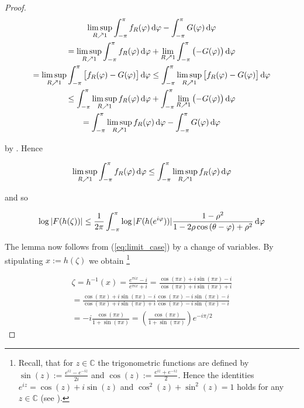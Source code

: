 \begin{proof}
\begin{multline*}
	\limsup_{R \nearrow 1} \int_{-\pi}^\pi f_R(\varphi) \d\varphi - \int_{-\pi}^\pi G(\varphi)\d\varphi\\
	= \limsup_{R \nearrow 1} \int_{-\pi}^\pi f_R(\varphi) \d\varphi + \lim_{R \nearrow 1}\int_{-\pi}^\pi \left(-G(\varphi)\right)\d\varphi\\
	= \limsup_{R \nearrow 1}\int_{-\pi}^\pi \left[ f_R(\varphi) - G(\varphi)\right]\d\varphi\leq \int_{-\pi}^\pi \limsup_{R \nearrow 1} \left[f_R(\varphi) - G(\varphi)\right]\d\varphi\\
	\leq \int_{-\pi}^\pi \limsup_{R \nearrow 1} f_R(\varphi) \d\varphi + \int_{-\pi}^\pi\lim_{R \nearrow 1} \left(-G(\varphi)\right)\d\varphi\\
	= \int_{-\pi}^\pi \limsup_{R \nearrow 1}f_R(\varphi) \d\varphi - \int_{-\pi}^\pi G(\varphi)\d\varphi
\end{multline*}

by \cite[358]{bourbaki:general_topology:1995}. Hence

\begin{equation*}
	\limsup_{R \nearrow 1} \int_{-\pi}^\pi f_R(\varphi) \mathop{}\!\mathrm{d}\varphi \leq\int_{-\pi}^\pi \limsup_{R \nearrow 1}f_R(\varphi) \mathop{}\!\mathrm{d}\varphi
\end{equation*}

and so 

\begin{equation}
	\log\vert F( h( \zeta ) )\vert \leq \frac{1}{2\pi} \int_{-\pi}^\pi \log\vert F( h( e^{i\varphi}))\vert \frac{1 - \rho^2}{1 - 2\rho\cos\left( \theta - \varphi \right) + \rho^2}\mathop{}\!\mathrm{d}\varphi	
	\label{eq:limit_case}
\end{equation}

The lemma now follows from (\ref{eq:limit_case}) by a change of variables. By stipulating $x := h\left( \zeta \right)$ we obtain \footnote{
		Recall, that for $z \in \mathbb{C}$ the trigonometric functions are defined by $\sin(z) := \frac{e^{iz} - e^{-iz}}{2i}$ and $\cos(z) := \frac{e^{iz} + e^{-iz}}{2}$. Hence the identities $e^{iz} = \cos(z) + i\sin(z)$ and $\cos^2(z) + \sin^2(z) = 1$ holds for any $z \in \mathbb{C}$ (see \cite[42--44]{ahlfors:complex_analysis:1979}).	
	}

\begin{multline}
	\zeta = h^{-1}(x) = \frac{e^{\pi i x}- i}{e^{\pi i x} + i} = \frac{\cos(\pi x) + i\sin(\pi x) - i}{\cos(\pi x) + i\sin(\pi x) + i}\\
		= \frac{\cos(\pi x) + i\sin(\pi x) - i}{\cos(\pi x) + i\sin(\pi x) + i}\frac{\cos(\pi x) - i\sin(\pi x) - i}{\cos(\pi x) - i\sin(\pi x) - i}\\
		= -i \frac{\cos(\pi x)}{1 + \sin(\pi x)} = \left( \frac{\cos(\pi x)}{1 + \sin(\pi x)} \right)e^{-i\pi/2}
	\label{eq:radius_angle}
\end{multline}


\end{proof}
